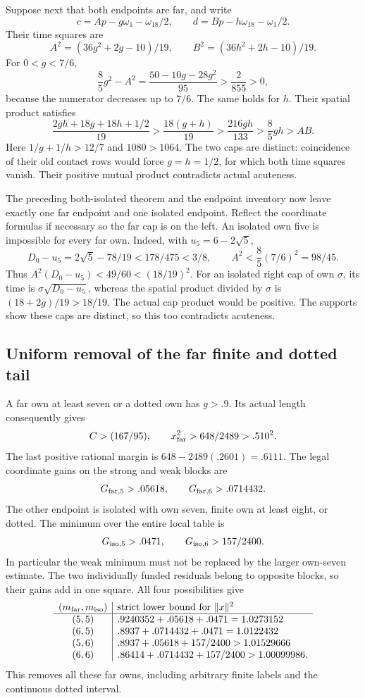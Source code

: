 \documentclass[11pt]{article}
\theoremstyle{definition}
\theoremstyle{remark}
\newcommand{\norm}[1]{\lVert #1\rVert}
\begin{document}
Suppose next that both endpoints are far, and write
\[
 c=A p-g\omega_1-\omega_{18}/2,\qquad
 d=B p-h\omega_{18}-\omega_1/2.
\]
Their time squares are
\[
 A^2=(36g^2+2g-10)/19,\qquad
 B^2=(36h^2+2h-10)/19 .
\]
For \(0<g<7/6\),
\[
 \frac85g^2-A^2
   =\frac{50-10g-28g^2}{95}>\frac2{855}>0,
\]
because the numerator decreases up to \(7/6\).
The same holds for \(h\). Their spatial product satisfies
\[
 \frac{2gh+18g+18h+1/2}{19}
 >\frac{18(g+h)}{19}
 >\frac{216gh}{133}
 >\frac85gh>AB.
\]
Here \(1/g+1/h>12/7\) and \(1080>1064\).
The two caps are distinct: coincidence of their old contact rows
would force \(g=h=1/2\), for which both time squares vanish.
Their positive mutual product contradicts actual acuteness.

The preceding both-isolated theorem and the endpoint inventory
now leave exactly one far endpoint and one isolated endpoint.
Reflect the coordinate formulas if necessary so the far cap is
on the left. An isolated own five is impossible for every far own.
Indeed, with \(u_5=6-2\sqrt5\),
\[
 D_0-u_5=2\sqrt5-78/19<178/475<3/8,\qquad
 A^2<\frac85(7/6)^2=98/45.
\]
Thus \(A^2(D_0-u_5)<49/60<(18/19)^2\).
For an isolated right cap of own \(\sigma\), its time is
\(\sigma\sqrt{D_0-u_5}\), whereas the spatial product divided
by \(\sigma\) is \((18+2g)/19>18/19\).
The actual cap product would be positive. The supports show
these caps are distinct, so this too contradicts acuteness.

\subsection{Uniform removal of the far finite and dotted tail}
\label{app:A18fartail}
A far own at least seven or a dotted own has \(g>.9\).
Its actual length consequently gives
\[
 C>(167/95),\qquad
 x_{\rm far}^2>648/2489>.510^2.
\]
The last positive rational margin is
\(648-2489(.2601)=.6111\).
The legal coordinate gains on the strong and weak blocks are
\[
 G_{\rm far,5}>.05618,\qquad
 G_{\rm far,6}>.0714432.
\]
The other endpoint is isolated with own seven, finite own at least
eight, or dotted. The minimum over the entire local table is
\[
 G_{\rm iso,5}>.0471,\qquad G_{\rm iso,6}>157/2400 .
\]
In particular the weak minimum must not be replaced by the larger
own-seven estimate. The two individually funded residuals belong
to opposite blocks, so their gains add in one square. All four
possibilities give
\[
\begin{array}{c|l}
(m_{\rm far},m_{\rm iso})&
 \text{strict lower bound for }\norm{x}^2\\ \hline
(5,5)&.9240352+.05618+.0471=1.0273152\\
(6,5)&.8937+.0714432+.0471=1.0122432\\
(5,6)&.8937+.05618+157/2400>1.01529666\\
(6,6)&.86414+.0714432+157/2400>1.00099986 .
\end{array}
\]
This removes all these far owns, including arbitrary finite
labels and the continuous dotted interval.
\end{document}
